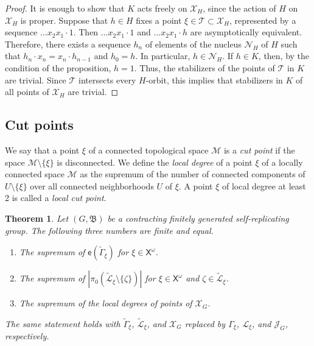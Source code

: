 \documentclass[11pt]{amsart}
\newcommand{\bim}{\mathfrak{B}}
\newcommand{\lims}[1][G]{\mathcal{J}_{#1}}
\newcommand{\limg}[1][G]{\mathcal{X}_{#1}}
\newcommand{\til}{\mathcal{T}}
\newcommand{\xo}{\alb^\omega}
\newcommand{\leaf}{\mathcal{L}}
\newcommand{\leaftilde}{\widetilde{\leaf}}
\newcommand{\M}{\ensuremath{\mathcal{M}}}%
\newcommand{\alb}{\ensuremath{\mathsf{X}}}%
\newcommand{\nuke}{\ensuremath{\mathcal{N}}}%
\newcommand{\Gammatilde}{\ensuremath{\widetilde{\Gamma}}}%
\newcommand{\esf}{\ensuremath{\mathsf{e}}}
\theoremstyle{definition}
\theoremstyle{plain}
\newtheorem{thm}[defin]{Theorem}
\newtheorem{main thm}{Theorem}
\theoremstyle{remark}
\theoremstyle{plain}
\begin{document}
\begin{proof}
It is enough to show that $K$ acts freely on $\limg[H]$, since the action of $H$ on $\limg[H]$ is proper. Suppose that $h\in H$ fixes a point $\xi\in\til\subset\limg[H]$, represented by a sequence $\ldots x_2x_1\cdot 1$. Then $\ldots x_2x_1\cdot 1$ and $\ldots x_2x_1\cdot h$ are asymptotically equivalent. Therefore, there exists a sequence $h_n$ of elements of the nucleus $\nuke_H$ of $H$ such that $h_n\cdot x_n=x_n\cdot h_{n-1}$ and $h_0=h$. In particular, $h\in\nuke_H$. If $h\in K$, then, by the condition of the proposition, $h=1$. Thus, the stabilizers of the points of $\til$ in $K$ are trivial. Since $\til$ intersects every $H$-orbit, this implies that stabilizers in $K$ of all points of $\limg[H]$ are trivial.
\end{proof}



\subsection{Cut points}
We say that a point $\xi$ of a connected topological space $\M$ is a \emph{cut point} if the space $\M\setminus\{\xi\}$ is disconnected. We define the \emph{local degree} of a point $\xi$ of a locally connected space $\M$ as the supremum of the number of connected components of $U\setminus\{\xi\}$ over all connected neighborhoods $U$ of $\xi$. A point $\xi$ of local degree at least 2 is called a \emph{local cut point}.


\begin{thm}
\label{th:endsandcutpoints}
    Let $(G, \bim)$ be a contracting finitely generated self-replicating group. The following three numbers are finite and equal.
    \begin{enumerate}
        \item The supremum of $\esf(\Gammatilde_\xi)$ for $\xi\in\xo$.
        \item The supremum of $|\pi_0(\leaftilde_\xi\setminus\{\zeta\})|$ for $\xi\in\xo$ and $\zeta\in\leaftilde_\xi$.
        \item The supremum of the local degrees of points of $\limg$.
    \end{enumerate}
    
The same statement holds with $\Gammatilde_\xi$, $\leaftilde_\xi$, and $\limg$ replaced by $\Gamma_\xi$, $\leaf_\xi$, and $\lims$, respectively.
\end{thm}
\end{document}
